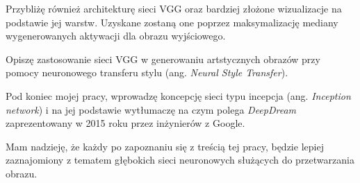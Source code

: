 Przybliżę również architekturę sieci VGG oraz bardziej złożone wizualizacje na podstawie jej warstw. Uzyskane zostaną one poprzez maksymalizację mediany wygenerowanych aktywacji dla obrazu wyjściowego.

Opiszę zastosowanie sieci VGG w generowaniu artstycznych obrazów przy pomocy neuronowego transferu stylu (ang. \textit{Neural Style Transfer}). 

Pod koniec mojej pracy, wprowadzę koncepcję sieci typu incepcja (ang. \textit{Inception network}) i na jej
podstawie wytłumaczę na czym polega \textit{DeepDream} zaprezentowany w 2015 roku przez inżynierów z Google.

Mam nadzieję, że każdy po zapoznaniu się z treścią tej pracy, będzie lepiej zaznajomiony z tematem głębokich sieci neuronowych służących do przetwarzania obrazu.
